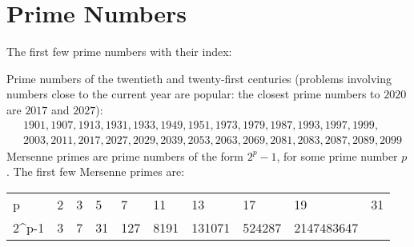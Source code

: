
\section*{Prime Numbers}
The first few prime numbers with their index:

\begin{minipage}{\textwidth}
\centering
{}
\end{minipage}

Prime numbers of the twentieth and twenty-first centuries (problems involving numbers close to the current year are popular: the closest prime numbers to $2020$ are $2017$ and $2027$):
\begin{align*}
& 1901, 1907, 1913, 1931, 1933, 1949, 1951, 1973, 1979, 1987, 1993, 1997, 1999, \\ 
& 2003, 2011, 2017, 2027, 2029, 2039, 2053, 2063, 2069, 2081, 2083, 2087, 2089, 2099
\end{align*}
Mersenne primes are prime numbers of the form $2^{p}-1$, for some prime number $p$. The first few Mersenne primes are:
\begin{center}
\begin{tabular}{X|XXXXXXXXX}
p       & 2 & 3 & 5  & 7   & 11   & 13   & 17     & 19     & 31 \\
2^{p}-1 & 3 & 7 & 31 & 127 & 8191 & 131071 & 524287 & 2147483647 \\
\end{tabular}
\end{center}

